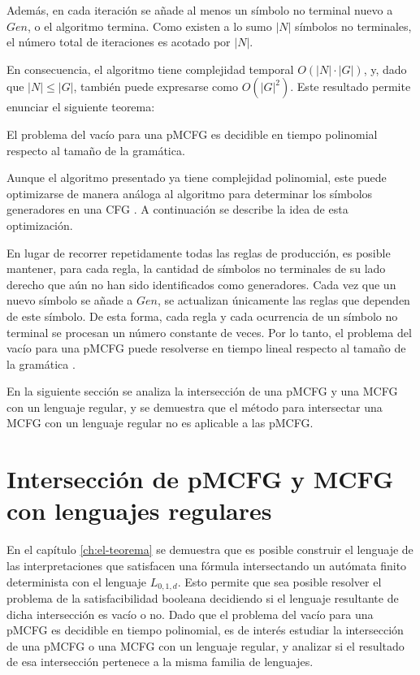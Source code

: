 Además, en cada iteración se añade al menos un símbolo no terminal nuevo a $Gen$, o el algoritmo termina. Como existen a lo sumo $|N|$ símbolos no terminales, el número total de iteraciones es acotado por $|N|$.

En consecuencia, el algoritmo tiene complejidad temporal $O(|N| \cdot |G|)$, y, dado que $|N| \leq |G|$, también puede expresarse como $O(|G|^2)$. Este resultado permite enunciar el siguiente teorema:

\begin{theorem}
    \label{thm:empty-pmcfg}
    El problema del vacío para una pMCFG es decidible en tiempo polinomial respecto al tamaño de la gramática.
\end{theorem}

Aunque el algoritmo presentado ya tiene complejidad polinomial, este puede optimizarse de manera análoga al algoritmo para determinar los símbolos generadores en una CFG \cite{automataTheory}. A continuación se describe la idea de esta optimización.

En lugar de recorrer repetidamente todas las reglas de producción, es posible mantener, para cada regla, la cantidad de símbolos no terminales de su lado derecho que aún no han sido identificados como generadores. Cada vez que un nuevo símbolo se añade a $Gen$, se actualizan únicamente las reglas que dependen de este símbolo. De esta forma, cada regla y cada ocurrencia de un símbolo no terminal se procesan un número constante de veces. Por lo tanto, el problema del vacío para una pMCFG puede resolverse en tiempo lineal respecto al tamaño de la gramática \cite{Seki1991OnMC}.

En la siguiente sección se analiza la intersección de una pMCFG y una MCFG con un lenguaje regular, y se demuestra que el método para intersectar una MCFG con un lenguaje regular no es aplicable a las pMCFG.

\section{Intersección de pMCFG y MCFG con lenguajes regulares}
\label{sec:pmcfg-intersection}

En el capítulo \ref{ch:el-teorema} se demuestra que es posible construir el lenguaje de las interpretaciones que satisfacen una fórmula intersectando un autómata finito determinista con el lenguaje $L_{0, 1, d}$. Esto permite que sea posible resolver el problema de la satisfacibilidad booleana decidiendo si el lenguaje resultante de dicha intersección es vacío o no. Dado que el problema del vacío para una pMCFG es decidible en tiempo polinomial, es de interés estudiar la intersección de una pMCFG o una MCFG con un lenguaje regular, y analizar si el resultado de esa intersección pertenece a la misma familia de lenguajes.

